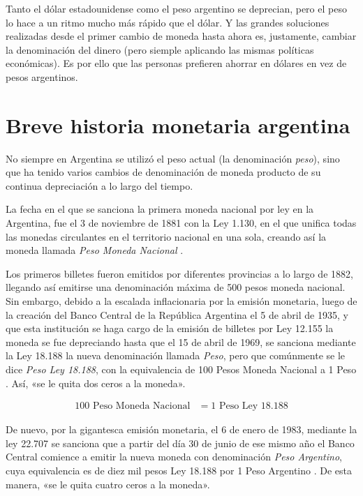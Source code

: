\documentclass[12pt,a4paper,twoside]{book}
\begin{document}
Tanto el dólar estadounidense como el peso argentino se deprecian, pero el peso lo hace a un ritmo mucho más rápido que el dólar. Y las grandes soluciones realizadas desde el primer cambio de moneda hasta ahora es, justamente, cambiar la denominación del dinero (pero siemple aplicando las mismas políticas económicas). Es por ello que las personas prefieren ahorrar en dólares en vez de pesos argentinos.

\section{Breve historia monetaria argentina}
No siempre en Argentina se utilizó el peso actual (la denominación \textit{peso}), sino que ha tenido varios cambios de denominación de moneda producto de su continua depreciación a lo largo del tiempo.

La fecha en el que se sanciona la primera moneda nacional por ley en la Argentina, fue el 3 de noviembre de 1881 con la Ley 1.130, en el que unifica todas las monedas circulantes en el territorio nacional en una sola, creando así la moneda llamada \textit{Peso Moneda Nacional} \cite{dineroarg:pmn}.

Los primeros billetes fueron emitidos por diferentes provincias a lo largo de 1882, llegando así emitirse una denominación máxima de 500 pesos moneda nacional. Sin embargo, debido a la escalada inflacionaria por la emisión monetaria, luego de la creación del Banco Central de la República Argentina el 5 de abril de 1935, y que esta institución se haga cargo de la emisión de billetes por Ley 12.155 \cite{dineroarg:bcra} la moneda se fue depreciando hasta que el 15 de abril de 1969, se sanciona mediante la Ley 18.188 la nueva denominación llamada \textit{Peso}, pero que comúnmente se le dice \textit{Peso Ley 18.188}, con la equivalencia de 100 Pesos Moneda Nacional a 1 Peso \cite{dineroarg:18188}. Así, «se le quita dos ceros a la moneda».

\begin{align*}
100 \text{ Peso Moneda Nacional} &= 1 \text{ Peso Ley 18.188}
\end{align*}

De nuevo, por la gigantesca emisión monetaria, el 6 de enero de 1983, mediante la ley 22.707 se sanciona que a partir del día 30 de junio de ese mismo año el Banco Central comience a emitir la nueva moneda con denominación \textit{Peso Argentino}, cuya equivalencia es de diez mil pesos Ley 18.188 por 1 Peso Argentino \cite{dineroarg:pesarg}. De esta manera, «se le quita cuatro ceros a la moneda».
\end{document}
